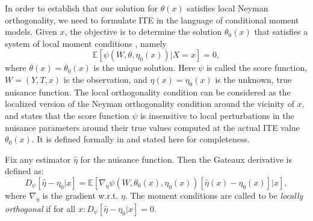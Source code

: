 \documentclass[sigconf]{acmart}
\theoremstyle{plain}
\newenvironment{definition}[1][Definition]{\begin{trivlist}
		\item[\hskip \labelsep {\bfseries #1}]}{\end{trivlist}}
\numberwithin{equation}{section}
\begin{document}
In order to establish that our solution for $\theta(x)$ satisfies local Neyman orthogonality, we need to formulate ITE in the language of conditional moment models. Given $x$, the objective is to determine the solution $\theta_0(x)$ that satisfies a system of local moment conditions \cite{OrthogonalRandomForest}, namely
\begin{equation}
\label{eq:momentcondition}
\mathbb{E}\left[\psi\left(W,\theta,\eta_0(x)\right) | X=x\right] = 0,
\end{equation}
where $\theta(x) = \theta_0(x)$ is the unique solution. Here $\psi$ is called the score function, $W = (Y, T, x)$ is the observation, and $\eta(x) = \eta_0(x)$ is the unknown, true nuisance function. The local orthogonality condition can be considered as the localized version of the Neyman orthogonality condition around the vicinity of $x$, and states that the score function $\psi$ is insensitive to local perturbations in the nuisance parameters around their true values computed at the actual ITE value $\theta_0(x)$. It is defined formally in \cite{OrthogonalRandomForest} and stated here for completeness.
\begin{definition}
Fix any estimator $\hat{\eta}$ for the nuisance function. Then the Gateaux derivative is defined as:
\begin{equation*}
D_{\psi} \left[\hat{\eta}-\eta_0 | x \right] = \mathbb{E}\left[\nabla_{\eta}\psi\left(W,\theta_0(x),\eta_0(x)\right) \left[\hat{\eta}(x)-\eta_0(x)\right]|x\right],
\end{equation*}
where $\nabla_{\eta}$ is the gradient w.r.t. $\eta$. The moment conditions are called to be \emph{locally orthogonal} if for all $x: D_{\psi} \left[\hat{\eta}-\eta_0 | x \right]=0$.
\end{definition}
\end{document}
